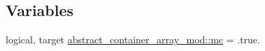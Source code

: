 \subsection*{Variables}
\begin{DoxyCompactItemize}
\item 
logical, target \mbox{\hyperlink{namespaceabstract__container__array__mod_a536c39baa7114f8ddff2dec5a90a894e}{abstract\+\_\+container\+\_\+array\+\_\+mod\+::mc}} = .true.
\end{DoxyCompactItemize}
